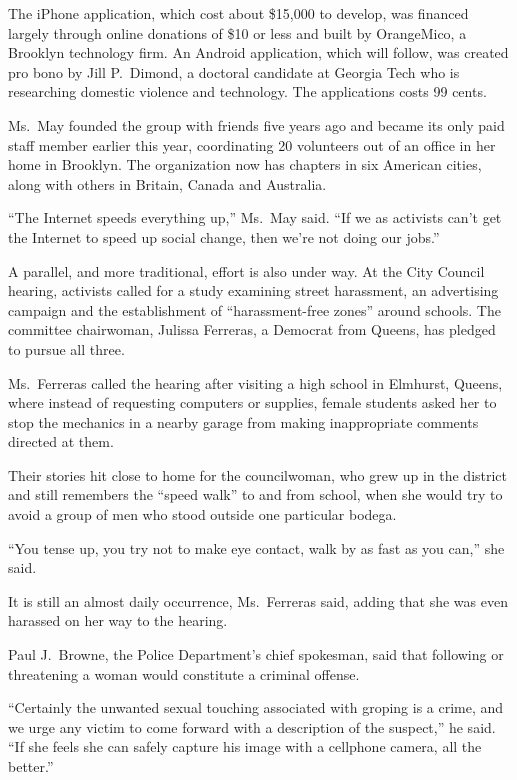 ﻿\documentclass[12pt]{article}
\begin{document}
The iPhone application, which cost about \$15,000 to develop, was financed largely through online
donations of \$10 or less and built by OrangeMico, a Brooklyn technology firm. An Android
application, which will follow, was created pro bono by Jill P.~Dimond, a doctoral candidate at
Georgia Tech who is researching domestic violence and technology. The applications costs 99 cents.

Ms.~May founded the group with friends five years ago and became its only paid staff member earlier
this year, coordinating 20 volunteers out of an office in her home in Brooklyn. The organization now
has chapters in six American cities, along with others in Britain, Canada and Australia.

``The Internet speeds everything up,'' Ms.~May said. ``If we as activists can't get the Internet to
speed up social change, then we're not doing our jobs.''

A parallel, and more traditional, effort is also under way. At the City Council hearing, activists
called for a study examining street harassment, an advertising campaign and the establishment of
``harassment-free zones'' around schools. The committee chairwoman, Julissa Ferreras, a Democrat
from Queens, has pledged to pursue all three.

Ms.~Ferreras called the hearing after visiting a high school in Elmhurst, Queens, where instead of
requesting computers or supplies, female students asked her to stop the mechanics in a nearby garage
from making inappropriate comments directed at them.

Their stories hit close to home for the councilwoman, who grew up in the district and still
remembers the ``speed walk'' to and from school, when she would try to avoid a group of men who
stood outside one particular bodega.

``You tense up, you try not to make eye contact, walk by as fast as you can,'' she said.

It is still an almost daily occurrence, Ms.~Ferreras said, adding that she was even harassed on her
way to the hearing.

Paul J.~Browne, the Police Department's chief spokesman, said that following or threatening a woman
would constitute a criminal offense.

``Certainly the unwanted sexual touching associated with groping is a crime, and we urge any victim
to come forward with a description of the suspect,'' he said. ``If she feels she can safely capture
his image with a cellphone camera, all the better.''
\end{document}
